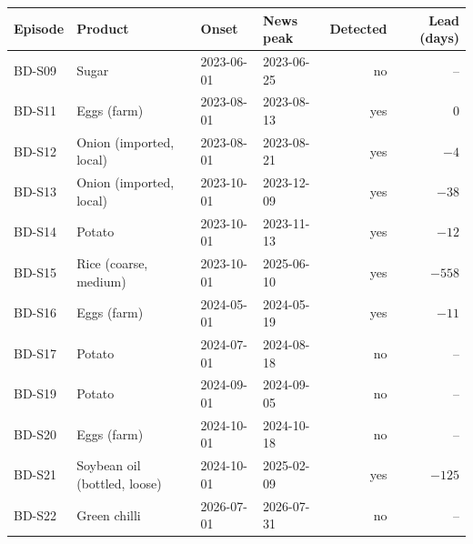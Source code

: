 \begin{tabular}{llllrr}
\toprule
\textbf{Episode} & \textbf{Product} & \textbf{Onset} & \textbf{News peak} & \textbf{Detected} & \textbf{Lead (days)} \\
\midrule
BD-S09 & Sugar & 2023-06-01 & 2023-06-25 & no & -- \\
BD-S11 & Eggs (farm) & 2023-08-01 & 2023-08-13 & yes & 0 \\
BD-S12 & Onion (imported, local) & 2023-08-01 & 2023-08-21 & yes & $-4$ \\
BD-S13 & Onion (imported, local) & 2023-10-01 & 2023-12-09 & yes & $-38$ \\
BD-S14 & Potato & 2023-10-01 & 2023-11-13 & yes & $-12$ \\
BD-S15 & Rice (coarse, medium) & 2023-10-01 & 2025-06-10 & yes & $-558$ \\
BD-S16 & Eggs (farm) & 2024-05-01 & 2024-05-19 & yes & $-11$ \\
BD-S17 & Potato & 2024-07-01 & 2024-08-18 & no & -- \\
BD-S19 & Potato & 2024-09-01 & 2024-09-05 & no & -- \\
BD-S20 & Eggs (farm) & 2024-10-01 & 2024-10-18 & no & -- \\
BD-S21 & Soybean oil (bottled, loose) & 2024-10-01 & 2025-02-09 & yes & $-125$ \\
BD-S22 & Green chilli & 2026-07-01 & 2026-07-31 & no & -- \\
\bottomrule
\end{tabular}
